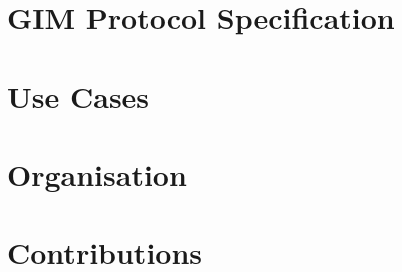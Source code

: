 \appendix
\chapter{GIM Protocol Specification}


\chapter{Use Cases}


\chapter{Organisation}


\chapter{Contributions}

